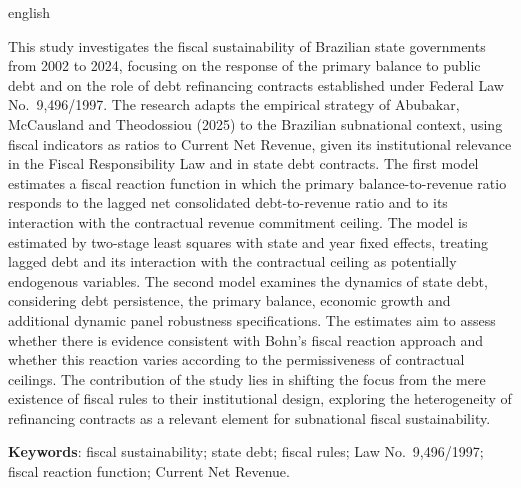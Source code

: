 \begin{resumo}[Abstract]
\begin{otherlanguage*}{english}

This study investigates the fiscal sustainability of Brazilian state governments from 2002 to 2024, focusing on the response of the primary balance to public debt and on the role of debt refinancing contracts established under Federal Law No.~9,496/1997. The research adapts the empirical strategy of Abubakar, McCausland and Theodossiou (2025) to the Brazilian subnational context, using fiscal indicators as ratios to Current Net Revenue, given its institutional relevance in the Fiscal Responsibility Law and in state debt contracts. The first model estimates a fiscal reaction function in which the primary balance-to-revenue ratio responds to the lagged net consolidated debt-to-revenue ratio and to its interaction with the contractual revenue commitment ceiling. The model is estimated by two-stage least squares with state and year fixed effects, treating lagged debt and its interaction with the contractual ceiling as potentially endogenous variables. The second model examines the dynamics of state debt, considering debt persistence, the primary balance, economic growth and additional dynamic panel robustness specifications. The estimates aim to assess whether there is evidence consistent with Bohn's fiscal reaction approach and whether this reaction varies according to the permissiveness of contractual ceilings. The contribution of the study lies in shifting the focus from the mere existence of fiscal rules to their institutional design, exploring the heterogeneity of refinancing contracts as a relevant element for subnational fiscal sustainability.

\vspace{\onelineskip}

\noindent
\textbf{Keywords}: fiscal sustainability; state debt; fiscal rules; Law No.~9,496/1997; fiscal reaction function; Current Net Revenue.

\end{otherlanguage*}
\end{resumo}
